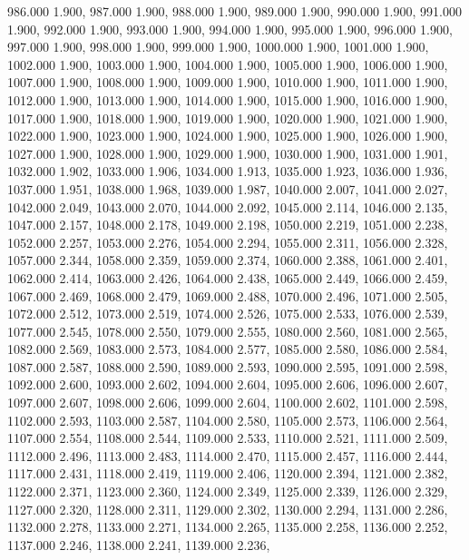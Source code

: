 986.000 1.900, 
987.000 1.900, 
988.000 1.900, 
989.000 1.900, 
990.000 1.900, 
991.000 1.900, 
992.000 1.900, 
993.000 1.900, 
994.000 1.900, 
995.000 1.900, 
996.000 1.900, 
997.000 1.900, 
998.000 1.900, 
999.000 1.900, 
1000.000 1.900, 
1001.000 1.900, 
1002.000 1.900, 
1003.000 1.900, 
1004.000 1.900, 
1005.000 1.900, 
1006.000 1.900, 
1007.000 1.900, 
1008.000 1.900, 
1009.000 1.900, 
1010.000 1.900, 
1011.000 1.900, 
1012.000 1.900, 
1013.000 1.900, 
1014.000 1.900, 
1015.000 1.900, 
1016.000 1.900, 
1017.000 1.900, 
1018.000 1.900, 
1019.000 1.900, 
1020.000 1.900, 
1021.000 1.900, 
1022.000 1.900, 
1023.000 1.900, 
1024.000 1.900, 
1025.000 1.900, 
1026.000 1.900, 
1027.000 1.900, 
1028.000 1.900, 
1029.000 1.900, 
1030.000 1.900, 
1031.000 1.901, 
1032.000 1.902, 
1033.000 1.906, 
1034.000 1.913, 
1035.000 1.923, 
1036.000 1.936, 
1037.000 1.951, 
1038.000 1.968, 
1039.000 1.987, 
1040.000 2.007, 
1041.000 2.027, 
1042.000 2.049, 
1043.000 2.070, 
1044.000 2.092, 
1045.000 2.114, 
1046.000 2.135, 
1047.000 2.157, 
1048.000 2.178, 
1049.000 2.198, 
1050.000 2.219, 
1051.000 2.238, 
1052.000 2.257, 
1053.000 2.276, 
1054.000 2.294, 
1055.000 2.311, 
1056.000 2.328, 
1057.000 2.344, 
1058.000 2.359, 
1059.000 2.374, 
1060.000 2.388, 
1061.000 2.401, 
1062.000 2.414, 
1063.000 2.426, 
1064.000 2.438, 
1065.000 2.449, 
1066.000 2.459, 
1067.000 2.469, 
1068.000 2.479, 
1069.000 2.488, 
1070.000 2.496, 
1071.000 2.505, 
1072.000 2.512, 
1073.000 2.519, 
1074.000 2.526, 
1075.000 2.533, 
1076.000 2.539, 
1077.000 2.545, 
1078.000 2.550, 
1079.000 2.555, 
1080.000 2.560, 
1081.000 2.565, 
1082.000 2.569, 
1083.000 2.573, 
1084.000 2.577, 
1085.000 2.580, 
1086.000 2.584, 
1087.000 2.587, 
1088.000 2.590, 
1089.000 2.593, 
1090.000 2.595, 
1091.000 2.598, 
1092.000 2.600, 
1093.000 2.602, 
1094.000 2.604, 
1095.000 2.606, 
1096.000 2.607, 
1097.000 2.607, 
1098.000 2.606, 
1099.000 2.604, 
1100.000 2.602, 
1101.000 2.598, 
1102.000 2.593, 
1103.000 2.587, 
1104.000 2.580, 
1105.000 2.573, 
1106.000 2.564, 
1107.000 2.554, 
1108.000 2.544, 
1109.000 2.533, 
1110.000 2.521, 
1111.000 2.509, 
1112.000 2.496, 
1113.000 2.483, 
1114.000 2.470, 
1115.000 2.457, 
1116.000 2.444, 
1117.000 2.431, 
1118.000 2.419, 
1119.000 2.406, 
1120.000 2.394, 
1121.000 2.382, 
1122.000 2.371, 
1123.000 2.360, 
1124.000 2.349, 
1125.000 2.339, 
1126.000 2.329, 
1127.000 2.320, 
1128.000 2.311, 
1129.000 2.302, 
1130.000 2.294, 
1131.000 2.286, 
1132.000 2.278, 
1133.000 2.271, 
1134.000 2.265, 
1135.000 2.258, 
1136.000 2.252, 
1137.000 2.246, 
1138.000 2.241, 
1139.000 2.236, 
